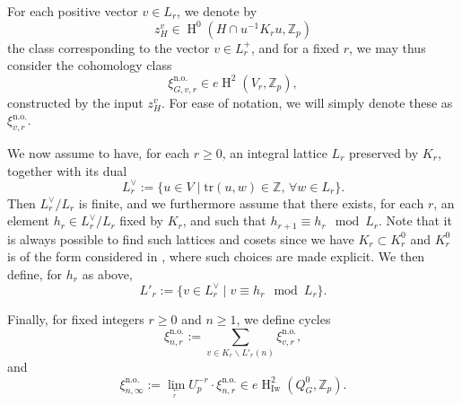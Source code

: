 \documentclass[12pt,a4paper,reqno]{amsart}
\theoremstyle{definition}
\numberwithin{definition}{subsection}
\theoremstyle{definition}
\numberwithin{Definition}{subsection}
\theoremstyle{remark}
\theoremstyle{remark}
\numberwithin{Remark}{subsection}
\theoremstyle{remark}
\theoremstyle{plain}
\numberwithin{Theorem}{subsection}
\theoremstyle{plain}
\theoremstyle{plain}
\theoremstyle{plain}
\theoremstyle{plain}
\newtheorem{Lemma}[Theorem]{Lemma}
\theoremstyle{plain}
\theoremstyle{plain}
\theoremstyle{plain}
\newcommand*{\Z}{\mathbb{Z}}
\DeclareMathOperator{\GL}{GL}
\DeclareMathOperator{\et}{\'e t}
\DeclareMathOperator{\h}{H}
\begin{document}
For each positive vector $v\in L_r$, we denote by $$z_H^v\in \h^0(H\cap u^{-1}K_ru,\Z_p)$$ the class corresponding to the vector $v\in L^+_r$, and for a fixed $r$, we may thus consider the cohomology class
\[
\xi_{G,v,r}^{\text{n.o.}}\in e\h^2(V_{r},\Z_p),
\]
constructed by the input $z_H^v$. For ease of notation, we will simply denote these as $\xi_{v,r}^{\text{n.o.}}$. 

We now assume to have, for each $r\geq 0$, an integral lattice $L_r$ preserved by $K_r$, together with its dual 
\[
L_r^\vee:=\{u\in V\mid \text{tr}(u,w)\in \Z,\,\forall w\in L_r\}.
\]
Then $L_r^\vee/L_r$ is finite, and we furthermore assume that there exists, for each $r$, an element $h_r\in L_r^\vee/L_r$ fixed by $K_r$, and such that $h_{r+1}\equiv h_r\mod L_r$. Note that it is always possible to find such lattices and cosets since we have $K_r\subset K_r^0$ and $K_r^0$ is of the form considered in \cite[\S$4.2$]{iudica}, where such choices are made explicit. We then define, for $h_r$ as above,
\[
L'_r:=\{v\in L_r^\vee\mid v\equiv h_r\mod L_r\}.
\]

Finally, for fixed integers $r\geq 0$ and $n\geq 1$, we define cycles
\[
\xi_{n,r}^{\text{n.o.}}:= \sum_{v\in K_r\backslash L'_r(n)}\xi_{v,r}^{\text{n.o.}},
\]
and 
\[
\xi_{n,\infty}^{\text{n.o.}}:= \lim_{_{\substack{\leftarrow\\r}}}U_p^{-r}\cdot\xi_{n,r}^{\text{n.o.}}\in e\h_{\text{Iw}}^2(Q^0_G,\Z_p).
\]

\end{document}
